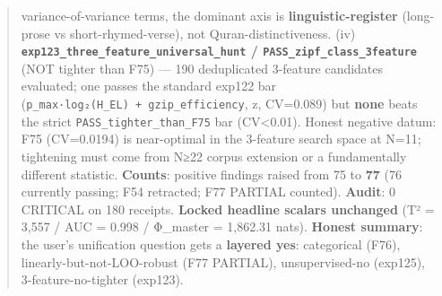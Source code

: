 \documentclass[
]{article}
\newcounter{none} %
\begin{document}
\begin{quote}
variance-of-variance terms, the dominant axis is
\textbf{linguistic-register} (long-prose vs short-rhymed-verse), not
Quran-distinctiveness. (iv)
\textbf{\texttt{exp123\_three\_feature\_universal\_hunt} /
\texttt{PASS\_zipf\_class\_3feature}} (NOT tighter than F75) --- 190
deduplicated 3-feature candidates evaluated; one passes the standard
exp122 bar (\texttt{p\_max·log₂(H\_EL)\ +\ gzip\_efficiency},
\textbar z, CV=0.089) but \textbf{none} beats the strict
\texttt{PASS\_tighter\_than\_F75} bar (CV\textless0.01). Honest negative
datum: F75 (CV=0.0194) is near-optimal in the 3-feature search space at
N=11; tightening must come from N≥22 corpus extension or a fundamentally
different statistic. \textbf{Counts}: positive findings raised from 75
to \textbf{77} (76 currently passing; F54 retracted; F77 PARTIAL
counted). \textbf{Audit}: 0 CRITICAL on 180 receipts. \textbf{Locked
headline scalars unchanged} (T² = 3,557 / AUC = 0.998 / Φ\_master =
1,862.31 nats). \textbf{Honest summary}: the user's unification question
gets a \textbf{layered yes}: categorical (F76),
linearly-but-not-LOO-robust (F77 PARTIAL), unsupervised-no (exp125),
3-feature-no-tighter (exp123).
\end{quote}
\end{document}
